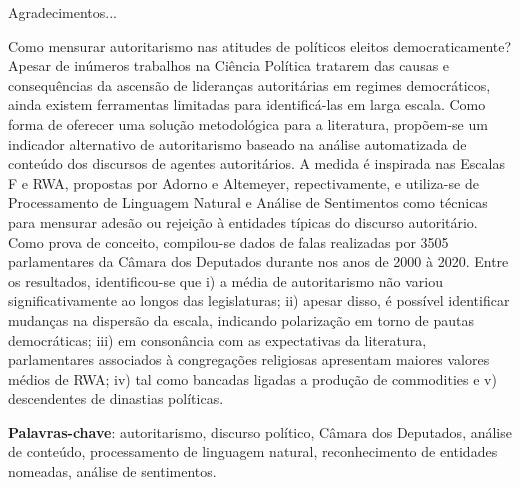 \documentclass[
12pt,				%
openright,			%
twoside,			%
a4paper,			%
english,			%
french,				%
spanish,			%
brazil				%
]{abntex2}
\begin{document}
\begin{agradecimentos}
	Agradecimentos...	
\end{agradecimentos}


\setlength{\absparsep}{18pt} %
\begin{resumo}
	Como mensurar autoritarismo nas atitudes de políticos eleitos democraticamente? Apesar de inúmeros trabalhos na Ciência Política tratarem das causas e consequências da ascensão de lideranças autoritárias em regimes democráticos, ainda existem ferramentas limitadas para identificá-las em larga escala. Como forma de oferecer uma solução metodológica para a literatura, propõem-se um indicador alternativo de autoritarismo baseado na análise automatizada de conteúdo dos discursos de agentes autoritários. A medida é inspirada nas Escalas F e RWA, propostas por Adorno e Altemeyer, repectivamente, e utiliza-se de Processamento de Linguagem Natural e Análise de Sentimentos como técnicas para mensurar adesão ou rejeição à entidades típicas do discurso autoritário. Como prova de conceito, compilou-se dados de falas realizadas por 3505 parlamentares da Câmara dos Deputados durante nos anos de 2000 à 2020. Entre os resultados, identificou-se que i) a média de autoritarismo não variou significativamente ao longos das legislaturas; ii) apesar disso, é possível identificar mudanças na dispersão da escala, indicando polarização em torno de pautas democráticas; iii) em consonância com as expectativas da literatura, parlamentares associados à congregações religiosas apresentam maiores valores médios de RWA; iv) tal como bancadas ligadas a produção de commodities e v) descendentes de dinastias políticas.

	\textbf{Palavras-chave}: autoritarismo, discurso político, Câmara dos Deputados, análise de conteúdo, processamento de linguagem natural, reconhecimento de entidades nomeadas, análise de sentimentos.
\end{resumo}
\end{document}
